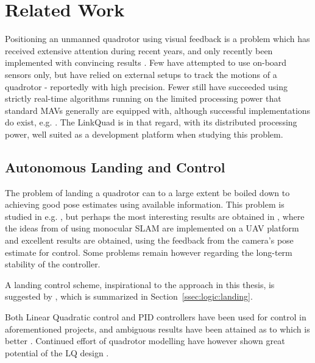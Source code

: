 \section{Related Work}
\label{sec:previouswork}

    Positioning an unmanned quadrotor using
    visual feedback is a problem which has received extensive attention
    during recent years, and only recently been implemented with convincing
    results \citep{DBLP:conf/icra/BloschWSS10,weiss11monocular}.
    Few have attempted to use on-board sensors only, but have relied on
    external setups to track the motions of a quadrotor - reportedly with high precision.
    Fewer still have succeeded using strictly real-time algorithms
    running on the limited processing power that standard
    MAVs generally are equipped with, although successful implementations do exist, e.g. \citep{Rudol10}.
    The LinkQuad is in that regard, with its distributed processing power, well suited
    as a development platform when studying this problem.

    \subsection{Autonomous Landing and Control}
    The problem of landing a quadrotor can to a large extent be boiled
    down to achieving good pose estimates using available information.
    This problem is studied in e.g. \citep{mellinger10perching,brockers:803111},
    but perhaps the most interesting results are obtained in \citep{DBLP:conf/icra/BloschWSS10,weiss11monocular},
    where the ideas from \citep{klein07parallel} of using monocular SLAM
    are implemented on a UAV platform and excellent results are obtained,
    using the feedback from the camera's pose estimate for control.
    Some problems remain however regarding the long-term stability of the controller.

    A landing control scheme, inspirational to the approach in this thesis,
    is suggested by \citep{brockers:803111}, which is summarized in Section~\ref{ssec:logic:landing}.

    Both Linear Quadratic control and PID controllers have been used for control
    in aforementioned projects, and ambiguous results have been attained
    as to which is better \citep{bouabdallah04pid}. Continued effort of
    quadrotor modelling have however shown great potential of the LQ design \citep{bouabdallah07full}.

